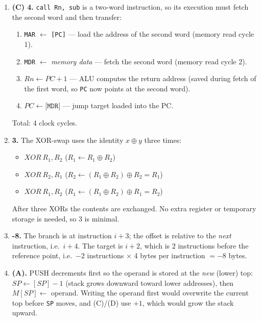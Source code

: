 \documentclass[11pt]{article}
\begin{document}
\begin{enumerate}
\item[\textbf{Q5}] \textbf{(C) 4.} \texttt{call Rn, sub} is a two-word instruction, so its execution must fetch the second word and then transfer:
\begin{enumerate}
  \item \texttt{MAR} $\gets$ \texttt{[PC]} --- load the address of the second word (memory read cycle 1).
  \item \texttt{MDR} $\gets$ \emph{memory data} --- fetch the second word (memory read cycle 2).
  \item $Rn \gets PC + 1$ --- ALU computes the return address (saved during fetch of the first word, so \texttt{PC} now points at the second word).
  \item $PC \gets \texttt{[MDR]}$ --- jump target loaded into the PC.
\end{enumerate}
Total: 4 clock cycles.

\item[\textbf{Q6}] \textbf{3.} The XOR-swap uses the identity $x \oplus y$ three times:
\begin{itemize}
  \item $XOR\ R_1, R_2$ \quad ($R_1 \gets R_1 \oplus R_2$)
  \item $XOR\ R_2, R_1$ \quad ($R_2 \gets (R_1 \oplus R_2) \oplus R_2 = R_1$)
  \item $XOR\ R_1, R_2$ \quad ($R_1 \gets (R_1 \oplus R_2) \oplus R_1 = R_2$)
\end{itemize}
After three XORs the contents are exchanged. No extra register or temporary storage is needed, so 3 is minimal.

\item[\textbf{Q7}] \textbf{-8.} The branch is at instruction $i{+}3$; the offset is relative to the \emph{next} instruction, i.e.\ $i{+}4$. The target is $i{+}2$, which is $2$ instructions before the reference point, i.e.\ $-2$ instructions $\times$ 4 bytes per instruction $= -8$ bytes.

\item[\textbf{Q8}] \textbf{(A).} PUSH decrements first so the operand is stored at the \emph{new} (lower) top: $SP \gets [SP]-1$ (stack grows downward toward lower addresses), then $M[SP] \gets$ operand. Writing the operand first would overwrite the current top before \texttt{SP} moves, and (C)/(D) use $+1$, which would grow the stack upward.
\end{enumerate}
\end{document}
